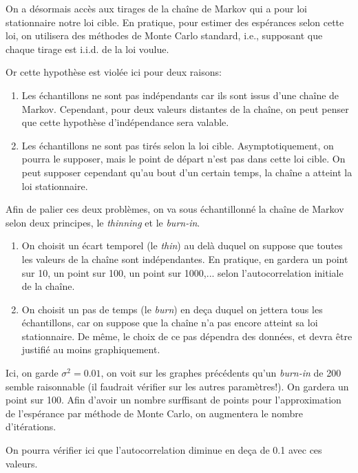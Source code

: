 \documentclass[]{article}
\newenvironment{Correction}%
  { \vspace{\baselineskip}\begin{mdframed}[backgroundcolor=my_green]}%
  {\end{mdframed}}
\begin{document}
\begin{Correction}
On a désormais accès aux tirages de la chaîne de Markov qui a pour loi stationnaire notre loi cible. En pratique, pour estimer des espérances selon cette loi, on utilisera des méthodes de Monte Carlo standard, i.e., supposant que chaque tirage est i.i.d. de la loi voulue. 

Or cette hypothèse est violée ici pour deux raisons:

\begin{enumerate}
\item Les échantillons ne sont pas indépendants car ils sont issus d'une chaîne de Markov. Cependant, pour deux valeurs distantes de la chaîne, on peut penser que cette hypothèse d'indépendance sera valable.
\item Les échantillons ne sont pas tirés selon la loi cible. Asymptotiquement, on pourra le supposer, mais le point de départ n'est pas dans cette loi cible. On peut supposer cependant qu'au bout d'un certain temps, la chaîne a atteint la loi stationnaire.
\end{enumerate}

Afin de palier ces deux problèmes, on va sous échantillonné la chaîne de Markov selon deux principes, le \textit{thinning} et le \textit{burn-in}.

\begin{enumerate}
\item On choisit un écart temporel (le \textit{thin}) au delà duquel on suppose que toutes les valeurs de la chaîne sont indépendantes. En pratique, en gardera un point sur 10, un point sur 100, un point sur 1000,... selon l'autocorrelation initiale de la chaîne.
\item On choisit un pas de temps (le \textit{burn}) en deça duquel on jettera tous les échantillons, car on suppose que la chaîne n'a pas encore atteint sa loi stationnaire. De même, le choix de ce pas dépendra des données, et devra être justifié au moins graphiquement.
\end{enumerate}

Ici, on garde $\sigma^2 = 0.01$, on voit sur les graphes précédents qu'un \textit{burn-in} de 200 semble raisonnable (il faudrait vérifier sur les autres paramètres!). On gardera un point sur 100. Afin d'avoir un nombre surffisant de points pour l'approximation de l'espérance par méthode de Monte Carlo, on augmentera le nombre d'itérations.

On pourra vérifier ici que l'autocorrelation diminue en deça de 0.1 avec ces valeurs.

\end{Correction}
\end{document}
